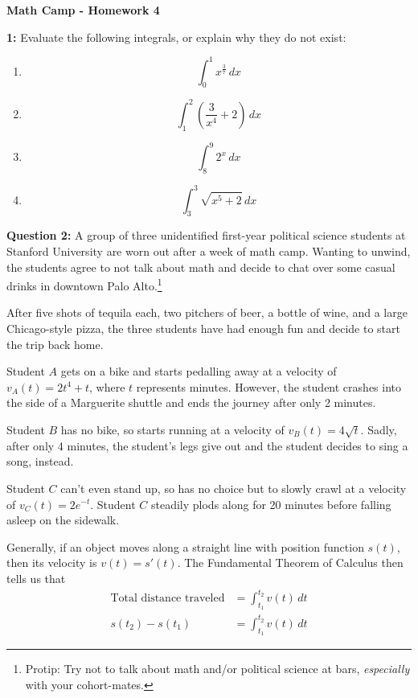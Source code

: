 \documentclass[12pt]{article}
\begin{document}
\centerline{\bf Math Camp - Homework 4}


\bigskip

\noindent \textbf{1:} Evaluate the following integrals, or explain why they do not exist:

\medskip

\begin{multicols}{2}
\begin{enumerate}
\item $$\int_0^1 x^{\frac{3}{7}} \,dx$$
\item $$\int_1^2 \left(\frac{3}{x^4} + 2\right) \,dx$$
\item $$\int_8^9 2^x \,dx$$
\item $$\int_3^3 \sqrt{x^5 + 2} \,dx$$
\end{enumerate}
\end{multicols}

\noindent \textbf{Question 2:} A group of three unidentified first-year political science students at Stanford University are worn out after a week of math camp. Wanting to unwind, the students agree to not talk about math and decide to chat over some casual drinks in downtown Palo Alto.\footnote{Protip: Try not to talk about math and/or political science at bars, \textit{especially} with your cohort-mates.}

After five shots of tequila each, two pitchers of beer, a bottle of wine, and a large Chicago-style pizza, the three students have had enough fun and decide to start the trip back home.

Student $A$ gets on a bike and starts pedalling away at a velocity of $v_A(t) = 2t^4 + t$, where $t$ represents minutes. However, the student crashes into the side of a Marguerite shuttle and ends the journey after only 2 minutes.

Student $B$ has no bike, so starts running at a velocity of $v_B(t) = 4\sqrt{t}$. Sadly, after only 4 minutes, the student's legs give out and the student decides to sing a song, instead.

Student $C$ can't even stand up, so has no choice but to slowly crawl at a velocity of $v_C(t) = 2e^{-t}$. Student $C$ steadily plods along for 20 minutes before falling asleep on the sidewalk.

Generally, if an object moves along a straight line with position function $s(t)$, then its velocity is $v(t) = s'(t)$. The Fundamental Theorem of Calculus then tells us that
\begin{align*}
\textrm{Total distance traveled} &= \int_{t_1}^{t_2} v(t) \,dt\\
s(t_2) - s(t_1) &= \int_{t_1}^{t_2} v(t) \,dt
\end{align*}
\end{document}
